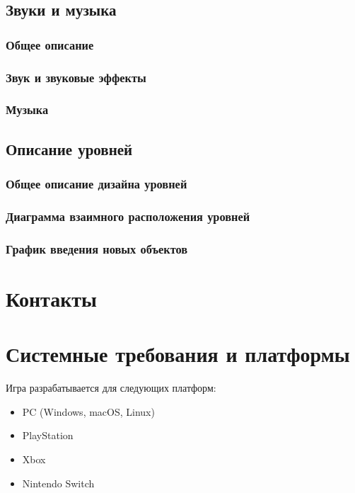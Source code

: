 \documentclass{article}
\begin{document}
\subsection{Звуки и музыка}

\subsubsection{Общее описание}

\subsubsection{Звук и звуковые эффекты}

\subsubsection{Музыка}

\subsection{Описание уровней}

\subsubsection{Общее описание дизайна уровней}

\subsubsection{Диаграмма взаимного расположения уровней}

\subsubsection{График введения новых объектов}

\section{Контакты}

\newpage

\section*{Системные требования и платформы}

Игра разрабатывается для следующих платформ:
\begin{itemize}
    \item PC (Windows, macOS, Linux)
    \item PlayStation
    \item Xbox
    \item Nintendo Switch
\end{itemize}
\end{document}
